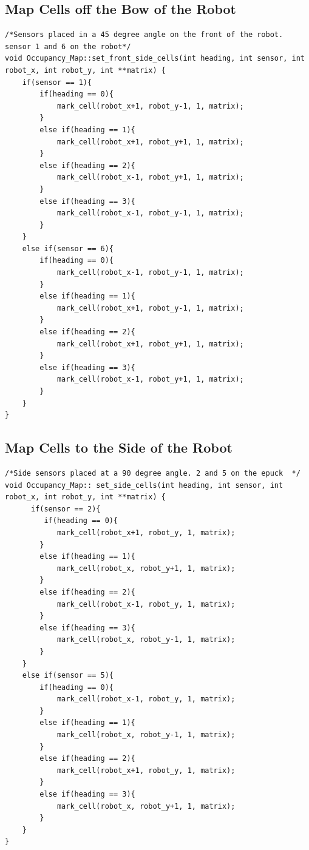 \subsection{Map Cells off the Bow of the Robot}
\label{code:set_bow}

\begin{lstlisting}[caption = {Code to Set Cells off the Bow of the Robot}]
/*Sensors placed in a 45 degree angle on the front of the robot. sensor 1 and 6 on the robot*/
void Occupancy_Map::set_front_side_cells(int heading, int sensor, int robot_x, int robot_y, int **matrix) {
    if(sensor == 1){
        if(heading == 0){
            mark_cell(robot_x+1, robot_y-1, 1, matrix);
        }
        else if(heading == 1){
            mark_cell(robot_x+1, robot_y+1, 1, matrix);
        }
        else if(heading == 2){
            mark_cell(robot_x-1, robot_y+1, 1, matrix);
        }
        else if(heading == 3){
            mark_cell(robot_x-1, robot_y-1, 1, matrix);
        }
    }
    else if(sensor == 6){
        if(heading == 0){
            mark_cell(robot_x-1, robot_y-1, 1, matrix);
        }
        else if(heading == 1){
            mark_cell(robot_x+1, robot_y-1, 1, matrix);
        }
        else if(heading == 2){
            mark_cell(robot_x+1, robot_y+1, 1, matrix);
        }
        else if(heading == 3){
            mark_cell(robot_x-1, robot_y+1, 1, matrix);
        }
    }
}
\end{lstlisting}

\subsection{Map Cells to the Side of the Robot}
\label{code:set_side}

\begin{lstlisting}[caption = {Code to Set Cells to the Sides of the Robot}]
/*Side sensors placed at a 90 degree angle. 2 and 5 on the epuck  */
void Occupancy_Map:: set_side_cells(int heading, int sensor, int robot_x, int robot_y, int **matrix) {
      if(sensor == 2){
         if(heading == 0){
            mark_cell(robot_x+1, robot_y, 1, matrix);
        }
        else if(heading == 1){
            mark_cell(robot_x, robot_y+1, 1, matrix);
        }
        else if(heading == 2){
            mark_cell(robot_x-1, robot_y, 1, matrix);
        }
        else if(heading == 3){
            mark_cell(robot_x, robot_y-1, 1, matrix);
        }
    }
    else if(sensor == 5){
        if(heading == 0){
            mark_cell(robot_x-1, robot_y, 1, matrix);
        }
        else if(heading == 1){
            mark_cell(robot_x, robot_y-1, 1, matrix);
        }
        else if(heading == 2){
            mark_cell(robot_x+1, robot_y, 1, matrix);
        }
        else if(heading == 3){
            mark_cell(robot_x, robot_y+1, 1, matrix);
        }
    }
}
\end{lstlisting}

